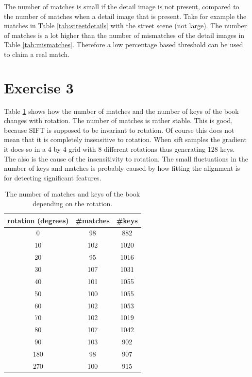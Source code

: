 \documentclass[11pt,a4paper]{article}
\begin{document}
\noindent The number of matches is small if the detail image is not present, compared to the number of matches when a detail image that is present.
Take for example the matches in Table \ref{tab:streetdetails} with the street scene (not large).
The number of matches is a lot higher than the number of mismatches of the detail images in Table \ref{tab:mismatches}.
Therefore a low percentage based threshold can be used to claim a real match. 

\section*{Exercise 3}

Table \ref{tab:bookrotation} shows how the number of matches and the number of keys of the book changes with rotation.
The number of matches is rather stable.
This is good, because SIFT is supposed to be invariant to rotation.
Of course this does not mean that it is completely insensitive to rotation.
When sift samples the gradient it does so in a 4 by 4 grid with 8 different rotations thus generating 128 keys.
The also is the cause of the insensitivity to rotation.
The small fluctuations in the number of keys and matches is probably caused by how fitting the alignment is for detecting significant features.

\begin{table}[h]
    \centering
    \begin{tabular}{c|c|c}
        rotation (degrees) & \#matches & \#keys \\
        \hline
        0 & 98 & 882 \\
        \hline
        10 & 102 & 1020 \\
        \hline
        20 & 95 & 1016 \\
        \hline
        30 & 107 & 1031 \\
        \hline
        40 & 101 & 1055 \\
        \hline
        50 & 100 & 1055 \\
        \hline
        60 & 102 & 1053 \\
        \hline
        70 & 102 & 1019 \\
        \hline
        80 & 107 & 1042 \\
        \hline
        90 & 103 & 902 \\
        \hline
        180 & 98 & 907 \\
        \hline
        270 & 100 & 915 \\
    \end{tabular}
    \caption{The number of matches and keys of the book depending on the rotation.}
    \label{tab:bookrotation}
\end{table}
\end{document}
